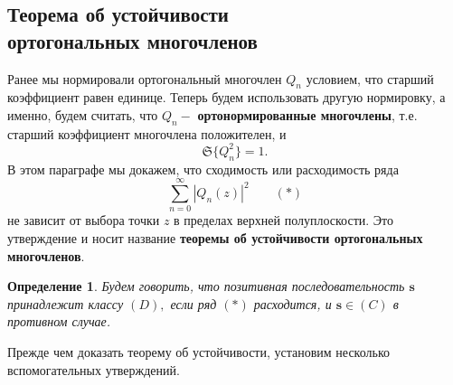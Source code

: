 \documentclass[12 pt, a4 paper]{article}
\theoremstyle{plain}   \newtheorem{Pro}{Задача}
\newtheorem{Def}{Определение}
\begin{document}
\subsection{Теорема об устойчивости \\
ортогональных многочленов}
$ \; $
\\
Ранее мы нормировали ортогональный многочлен
$ Q_n $
условием, что старший коэффициент равен единице.
Теперь будем использовать другую нормировку, а именно,
будем считать, что
$ Q_n - $
{\bfseries ортонормированные многочлены},
т.е. старший коэффициент многочлена положителен, и
$$
  \mathfrak{S} \{ Q_n ^2 \} =1.
$$
В этом параграфе мы докажем, что сходимость или расходимость ряда
$$
  \sum _{n=0}^{\infty}|Q_n (z)|^2
  \qquad ( \ast )
$$
не зависит от выбора точки
$ z $
в пределах верхней полуплоскости. Это утверждение и носит
название
{\bfseries теоремы об устойчивости ортогональных многочленов}.
\begin{Def}
Будем говорить, что позитивная последовательность
$ \mathbf{s} $
принадлежит классу
$ (D) , $
если ряд
$ (\ast ) $
расходится, и
$ \mathbf{s} \in (C) $
в противном случае.
\end{Def}
Прежде чем доказать теорему об устойчивости,
установим несколько вспомогательных утверждений.
\\
\end{document}
